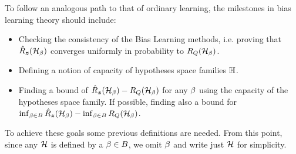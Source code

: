 To follow an analogous path to that of ordinary learning, the milestones in bias learning theory should include:
\begin{itemize}
    \item Checking the consistency of the Bias Learning methods, i.e. proving that $\hat{R}_{\bm{z}}(\mathcal{H}_\beta)$ converges uniformly in probability to $R_Q(\mathcal{H}_\beta)$.
    \item Defining a notion of capacity of hypotheses space families $\mathbb{H}$.
    \item Finding a bound of $\hat{R}_{\bm{z}}(\mathcal{H}_\beta) - R_Q(\mathcal{H}_\beta)$ for any $\beta$ using the capacity of the hypotheses space family. If possible, finding also a bound for $\inf_{\beta \in B}\hat{R}_{\bm{z}}(\mathcal{H}_\beta) - \inf_{\beta \in B} R_Q(\mathcal{H}_\beta)$.
\end{itemize}
To achieve these goals some previous definitions are needed. From this point, since any $\mathcal{H}$ is defined by a $\beta \in B$, we omit $\beta$ and write just $\mathcal{H}$ for simplicity.
%
